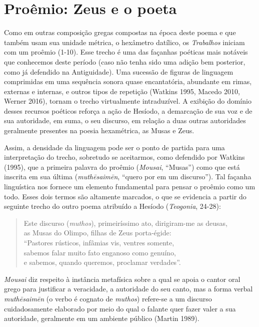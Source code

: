 \section{Proêmio: Zeus e o poeta}

Como em outras composição gregas compostas na época deste poema e que
também usam sua unidade métrica, o hexâmetro datílico, os
\emph{Trabalhos} iniciam com um proêmio (1-10). Esse trecho é uma das
façanhas poéticas mais notáveis que conhecemos deste período (caso não
tenha sido uma adição bem posterior, como já defendido na Antiguidade).
Uma sucessão de figuras de linguagem comprimidas em uma sequência sonora
quase encantatória, abundante em rimas, externas e internas, e outros
tipos de repetição (Watkins 1995, Macedo 2010, Werner 2016), tornam o
trecho virtualmente intraduzível. A exibição do domínio desses recursos
poéticos reforça a ação de Hesíodo, a demarcação de sua voz e de sua
autoridade, em suma, o seu discurso, em relação a duas outras
autoridades geralmente presentes na poesia hexamétrica, as Musas e Zeus.

Assim, a densidade da linguagem pode ser o ponto de partida para uma
interpretação do trecho, sobretudo se aceitarmos, como defendido por
Watkins (1995), que a primeira palavra do proêmio (\emph{Mousai},
``Musas'') como que está inscrita em sua última
(\emph{\emph{muthēsaimēn}}, ``quero por em um discurso''). Tal façanha
linguística nos fornece um elemento fundamental para pensar o proêmio
como um todo. Esses dois termos são altamente marcados, o que se
evidencia a partir do seguinte trecho do outro poema atribuído a Hesíodo
(\emph{Teogonia}, 24-28):

\begin{verse}
Este discurso (\emph{muthos}), primeiríssimo ato, dirigiram-me as deusas,\\
as Musas do Olimpo, filhas de Zeus porta-égide:\\
``Pastores rústicos, infâmias vis, ventres somente,\\
sabemos falar muito fato enganoso como genuíno,\\
e sabemos, quando queremos, proclamar verdades''.
\end{verse}

\emph{Mousai} diz respeito à instância metafísica sobre a qual se apoia
o cantor oral grego para justificar a veracidade, a autoridade do seu
canto, mas a forma verbal \emph{muthēsaimēn} (o verbo é cognato de
\emph{muthos}) refere-se a um discurso cuidadosamente elaborado por meio
do qual o falante quer fazer valer a sua autoridade, geralmente em um
ambiente público (Martin 1989).

